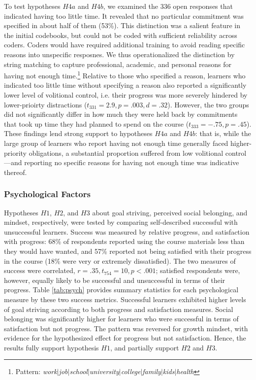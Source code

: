 \documentclass{sigchi}\usepackage[]{graphicx}\usepackage[]{color}
\begin{document}
To test hypotheses $H4a$ and $H4b$, we examined the 336 open responses that indicated having too little time. It revealed that no particular commitment was specified in about half of them (53\%). This distinction was a salient feature in the initial codebooks, but could not be coded with sufficient reliability across coders. Coders would have required additional training to avoid reading specific reasons into unspecific resposnes. We thus operationalized the distinction by string matching to capture professional, academic, and personal reasons for having not enough time.\footnote{Pattern: {\em work$|$job$|$school$|$university$|$college$|$family$|$kids$|$health}} Relative to those who specified a reason, learners who indicated too little time without specifying a reason also reported a significantly lower level of volitional control, i.e. their progress was more severely hindered by lower-prioirty distractions ($t_{331}=2.9, p=.003, d=.32$). However, the two groups did not significantly differ in how much they were held back by commitments that took up time they had planned to spend on the course ($t_{333}=-.75, p=.45$). These findings lend strong support to hypotheses $H4a$ and $H4b$: that is, while the large group of learners who report having not enough time generally faced higher-priority obligations, a substantial proportion suffered from low volitional control---and reporting no specific reasons for having not enough time was indicative thereof.

\subsubsection{Psychological Factors}

Hypotheses $H1$, $H2$, and $H3$ about goal striving, perceived social belonging, and mindset, respectively, were tested by comparing self-described successful with unsuccessful learners. Success was measured by relative progress, and satisfaction with progress: 68\% of respondents reported using the course materials less than they would have wanted, and 57\% reported not being satisfied with their progress in the course (18\% were very or extremely dissatisfied). The two measures of success were correlated, $r=.35, t_{754}=10, p<.001$; satisfied respondents were, however, equally likely to be successful and unsuccessful in terms of their progress. Table \ref{tab:psych} provides summary statistics for each psychological measure by these two success metrics. Successful learners exhibited higher levels of goal striving according to both progress and satisfaction measures. Social belonging was significantly higher for learners who were successful in terms of satisfaction but not progress. The pattern was reversed for growth mindset, with evidence for the hypothesized effect for progress but not satisfaction. Hence, the results fully support hypothesis $H1$, and partially support $H2$ and $H3$.
\end{document}
